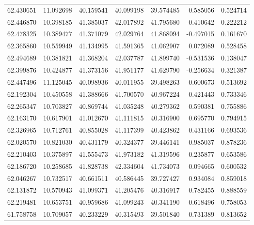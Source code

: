 \begin{tabular}{rrrrrrr}
 62.430651 &  11.092698 &         40.159541 &         40.099198 &         39.574485 &  0.585056 &  0.524714 \\
 62.446870 &  10.398185 &         41.385037 &         42.017892 &         41.795680 & -0.410642 &  0.222212 \\
 62.478325 &  10.389477 &         41.371079 &         42.029764 &         41.868094 & -0.497015 &  0.161670 \\
 62.365860 &  10.559949 &         41.134995 &         41.591365 &         41.062907 &  0.072089 &  0.528458 \\
 62.494689 &  10.381821 &         41.368204 &         42.037787 &         41.899740 & -0.531536 &  0.138047 \\
 62.399876 &  10.424877 &         41.373156 &         41.951177 &         41.629790 & -0.256634 &  0.321387 \\
 62.447496 &  11.125045 &         40.098936 &         40.011955 &         39.498263 &  0.600673 &  0.513692 \\
 62.192304 &  10.450558 &         41.388666 &         41.700570 &         40.967224 &  0.421443 &  0.733346 \\
 62.265347 &  10.703827 &         40.869744 &         41.035248 &         40.279362 &  0.590381 &  0.755886 \\
 62.163170 &  10.617901 &         41.012670 &         41.111815 &         40.316900 &  0.695770 &  0.794915 \\
 62.326965 &  10.712761 &         40.855028 &         41.117399 &         40.423862 &  0.431166 &  0.693536 \\
 62.020570 &  10.821030 &         40.431179 &         40.324377 &         39.446141 &  0.985037 &  0.878236 \\
 62.210403 &  10.375897 &         41.555473 &         41.973182 &         41.319596 &  0.235877 &  0.653586 \\
 62.186720 &  10.258685 &         41.828738 &         42.334604 &         41.734073 &  0.094665 &  0.600532 \\
 62.046267 &  10.732517 &         40.661511 &         40.586445 &         39.727427 &  0.934084 &  0.859018 \\
 62.131872 &  10.570943 &         41.099371 &         41.205476 &         40.316917 &  0.782455 &  0.888559 \\
 62.219481 &  10.653751 &         40.959686 &         41.099243 &         40.341190 &  0.618496 &  0.758053 \\
 61.758758 &  10.709057 &         40.233229 &         40.315493 &         39.501840 &  0.731389 &  0.813652 \\

\end{tabular}
